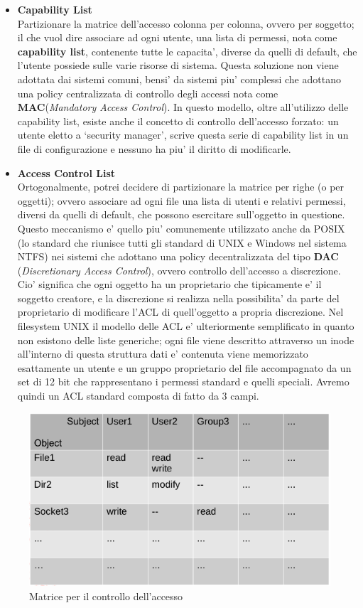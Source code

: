 \begin{itemize}
	\item \textbf{Capability List} \\
		Partizionare la matrice dell'accesso colonna per colonna, ovvero per soggetto; il che vuol dire  associare ad ogni utente, una lista di permessi, nota come \textbf{capability list}, contenente tutte le capacita', diverse da quelli di default, che l'utente possiede sulle varie risorse di sistema. Questa soluzione non viene adottata dai sistemi comuni, bensi' da sistemi piu' complessi che adottano una policy centralizzata di controllo degli accessi nota come \textbf{MAC}(\emph{Mandatory Access Control}). In questo modello, oltre all'utilizzo delle capability list, esiste anche il concetto di controllo dell'accesso forzato: un utente eletto a `security manager', scrive questa serie di capability list in un file di configurazione e nessuno ha piu' il diritto di modificarle.
	\item \textbf{Access Control List}\\
		Ortogonalmente, potrei decidere di partizionare la matrice per righe (o per oggetti); ovvero associare ad ogni file una lista di utenti e relativi permessi, diversi da quelli di default, che possono esercitare sull'oggetto in questione. Questo meccanismo e' quello piu' comunemente utilizzato anche da POSIX (lo standard che riunisce tutti gli standard di UNIX e Windows nel sistema NTFS) nei sistemi che adottano una policy decentralizzata del tipo \textbf{DAC} (\emph{Discretionary Access Control}), ovvero controllo dell'accesso a discrezione. Cio' significa che ogni oggetto ha un proprietario che tipicamente e' il soggetto creatore, e la discrezione si realizza nella possibilita' da parte del proprietario di modificare l'ACL di quell'oggetto a propria discrezione. Nel filesystem UNIX il modello delle ACL e' ulteriormente semplificato in quanto non esistono delle liste generiche; ogni file viene descritto attraverso un inode all'interno di questa struttura dati e' contenuta viene memorizzato esattamente un utente e un gruppo proprietario del file accompagnato da un set di 12 bit che rappresentano i permessi standard e quelli speciali. Avremo quindi un ACL standard composta di fatto da 3 campi.
\end{itemize}
\begin{figure}[H]
	\centering
	\includegraphics[scale=0.5]{img/acmatrix.png}
	\caption{Matrice per il controllo dell'accesso}
\end{figure}


